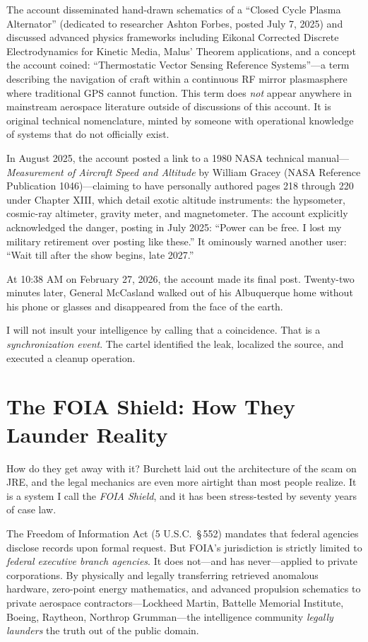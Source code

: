 \documentclass[11pt,a4paper]{article}
\begin{document}
The account disseminated hand-drawn schematics of a ``Closed Cycle Plasma Alternator'' (dedicated to researcher Ashton Forbes, posted July 7, 2025) and discussed advanced physics frameworks including Eikonal Corrected Discrete Electrodynamics for Kinetic Media, Malus' Theorem applications, and a concept the account coined: ``Thermostatic Vector Sensing Reference Systems''---a term describing the navigation of craft within a continuous RF mirror plasmasphere where traditional GPS cannot function. This term does \textit{not} appear anywhere in mainstream aerospace literature outside of discussions of this account. It is original technical nomenclature, minted by someone with operational knowledge of systems that do not officially exist.

In August 2025, the account posted a link to a 1980 NASA technical manual---\textit{Measurement of Aircraft Speed and Altitude} by William Gracey (NASA Reference Publication 1046)---claiming to have personally authored pages 218 through 220 under Chapter XIII, which detail exotic altitude instruments: the hypsometer, cosmic-ray altimeter, gravity meter, and magnetometer. The account explicitly acknowledged the danger, posting in July 2025: ``Power can be free. I lost my military retirement over posting like these.'' It ominously warned another user: ``Wait till after the show begins, late 2027.''

At 10:38 AM on February 27, 2026, the account made its final post. Twenty-two minutes later, General McCasland walked out of his Albuquerque home without his phone or glasses and disappeared from the face of the earth.

I will not insult your intelligence by calling that a coincidence. That is a \textit{synchronization event}. The cartel identified the leak, localized the source, and executed a cleanup operation.

\section{The FOIA Shield: How They Launder Reality}

How do they get away with it? Burchett laid out the architecture of the scam on JRE, and the legal mechanics are even more airtight than most people realize. It is a system I call the \textit{FOIA Shield}, and it has been stress-tested by seventy years of case law.

The Freedom of Information Act (5 U.S.C.\ \S\,552) mandates that federal agencies disclose records upon formal request. But FOIA's jurisdiction is strictly limited to \textit{federal executive branch agencies}. It does not---and has never---applied to private corporations. By physically and legally transferring retrieved anomalous hardware, zero-point energy mathematics, and advanced propulsion schematics to private aerospace contractors---Lockheed Martin, Battelle Memorial Institute, Boeing, Raytheon, Northrop Grumman---the intelligence community \textit{legally launders} the truth out of the public domain.
\end{document}
